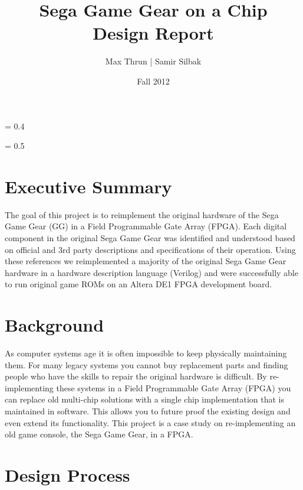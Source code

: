 \documentclass{article}
\title{
    \vspace{2in}
    \textbf{Sega Game Gear on a Chip}\\
    Design Report
    \vspace{3in}
}
\author{ Max Thrun | Samir Silbak}
\date{Fall 2012}
\begin{document}
\maketitle

\newpage
\parskip = 0.4\baselineskip
\tableofcontents

\parskip = 0.5\baselineskip

\newpage

\section{Executive Summary}

The goal of this project is to reimplement the original hardware of the Sega Game
Gear (GG) in a Field Programmable Gate Array (FPGA). Each digital component in
the original Sega Game Gear was identified and understood based on official
and 3rd party descriptions and specifications of their operation. Using these
references we reimplemented a majority of the original Sega Game Gear hardware in
a hardware description language (Verilog) and were successfully able to run original
game ROMs on an Altera DE1 FPGA development board.

\section{Background}

As computer systems age it is often impossible to keep physically maintaining
them.  For many legacy systems you cannot buy replacement parts and finding
people who have the skills to repair the original hardware is difficult. By
re-implementing these systems in a Field Programmable Gate Array (FPGA) you can
replace old multi-chip solutions with a single chip implementation that is
maintained in software. This allows you to future proof the existing design and
even extend its functionality. This project is a case study on re-implementing
an old game console, the Sega Game Gear, in a FPGA.

\section{Design Process}
\end{document}
